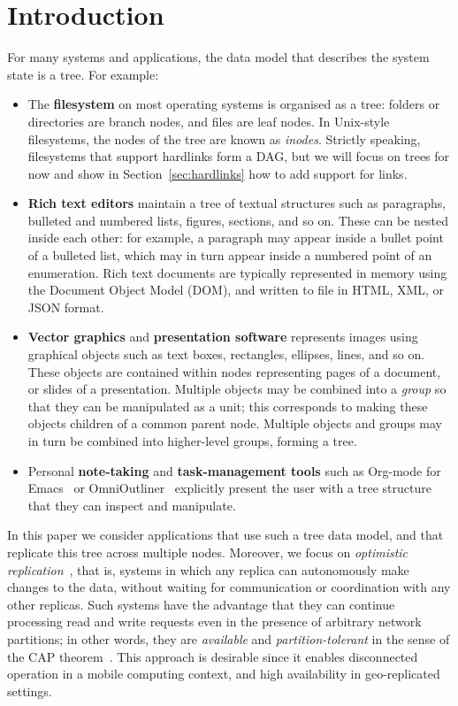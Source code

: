 \documentclass[sigconf]{acmart}
\begin{document}
\section{Introduction}\label{sec:intro}

For many systems and applications, the data model that describes the system state is a tree.
For example:
\begin{itemize}
    \item The \textbf{filesystem} on most operating systems is organised as a tree: folders or directories are branch nodes, and files are leaf nodes.
        In Unix-style filesystems, the nodes of the tree are known as \emph{inodes}.
        Strictly speaking, filesystems that support hardlinks form a DAG, but we will focus on trees for now and show in Section~\ref{sec:hardlinks} how to add support for links.
    \item \textbf{Rich text editors} maintain a tree of textual structures such as paragraphs, bulleted and numbered lists, figures, sections, and so on.
        These can be nested inside each other: for example, a paragraph may appear inside a bullet point of a bulleted list, which may in turn appear inside a numbered point of an enumeration.
        Rich text documents are typically represented in memory using the Document Object Model (DOM), and written to file in HTML, XML, or JSON format.
    \item \textbf{Vector graphics} and \textbf{presentation software} represents images using graphical objects such as text boxes, rectangles, ellipses, lines, and so on.
        These objects are contained within nodes representing pages of a document, or slides of a presentation.
        Multiple objects may be combined into a \emph{group} so that they can be manipulated as a unit; this corresponds to making these objects children of a common parent node.
        Multiple objects and groups may in turn be combined into higher-level groups, forming a tree.
    \item Personal \textbf{note-taking} and \textbf{task-management tools} such as Org-mode for Emacs~\cite{OrgMode} or OmniOutliner~\cite{OmniOutliner} explicitly present the user with a tree structure that they can inspect and manipulate.
\end{itemize}

In this paper we consider applications that use such a tree data model, and that replicate this tree across multiple nodes.
Moreover, we focus on \emph{optimistic replication}~\cite{Saito:2005jw}, that is, systems in which any replica can autonomously make changes to the data, without waiting for communication or coordination with any other replicas.
Such systems have the advantage that they can continue processing read and write requests even in the presence of arbitrary network partitions; in other words, they are \emph{available} and \emph{partition-tolerant} in the sense of the CAP theorem~\cite{Gilbert:2002il}.
This approach is desirable since it enables disconnected operation in a mobile computing context, and high availability in geo-replicated settings.
\end{document}

